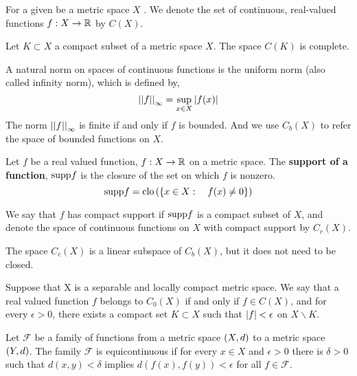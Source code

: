 \begin{definition}[Continuity]
	
\end{definition}


For a given be a metric space $X$ . We denote the set of continuous, real-valued functions $f:X\rightarrow \mathbb{R}$ by $C(X)$.

\begin{theorem}
	Let $K\subset X$ a compact subset of a metric space $X$. The space $C(K)$ is complete.
\end{theorem}
A natural norm on spaces of continuous functions is the uniform norm (also called infinity norm), which is defined by,
\begin{equation*}
\left|\left|f\right|\right|_{\infty}=\sup_{x\in X} \left| f(x) \right|
\end{equation*}
The norm $\left|\left|f\right|\right|_{\infty}$ is finite if and only if $f$ is bounded. And we use $C_b(X)$ to refer the space of bounded functions on $X$.

\begin{definition}
	Let $f$ be a real valued function, $f:X\rightarrow \mathbb{R}$ on a metric space. The \textbf{support of a function}, $\mathrm{supp} f$ is the closure of the set on which $f$ is nonzero.
	\begin{equation*}
	\mathrm{supp} f = \mathrm{clo}\left( {\left\lbrace x\in X: \quad f(x)\neq 0 \right\rbrace} \right)
	\end{equation*}
	
\end{definition}
We say that $f$ has compact support if $\mathrm{supp} f$ is a compact subset of $X$, and denote the space of continuous functions on $X$ with compact support by $C_c(X)$.

The space $C_c(X)$ is a linear subspace of $C_b(X)$, but it does not need to be closed. 

\begin{definition}
	Suppose that X is a separable and locally compact metric space.	We say that a real valued function $f$ belongs to $C_0(X)$ if and only if $f\in C(X)$, and for every $\epsilon >0$, there exists a compact set $K\subset X$ such that $\left| f \right|<\epsilon$ on $X\backslash K$. 
\end{definition}

\begin{definition}
	Let $\mathcal F$ be a family of functions from a metric space $\left( X, d \right)$ to a metric space $\left( Y, d \right)$. The family $\mathcal{F}$ is equicontinuous if for every $x\in X$ and $\epsilon > 0$ there is $\delta >0$ such that $d(x,y)<\delta$ implies $d(f(x), f(y))<\epsilon$ for all $f\in \mathcal F$.
\end{definition}

